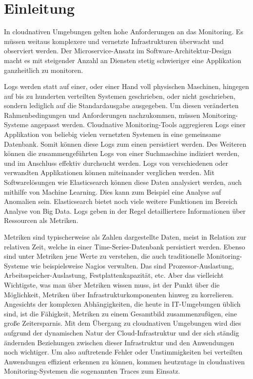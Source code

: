 \section{Einleitung}
\noindent
In cloudnativen Umgebungen gelten hohe Anforderungen an das Monitoring.
Es müssen weitaus komplexere und vernetzte Infrastrukturen überwacht und observiert werden.
Der Microservice-Ansatz im Software-Architektur-Design macht es mit
steigender Anzahl an Diensten stetig schwieriger eine Applikation 
ganzheitlich zu monitoren. 

Logs werden statt auf einer, oder 
einer Hand voll physischen Maschinen, hingegen auf bis zu hunderten
verteilten Systemen geschrieben, oder nicht geschrieben, sondern lediglich auf 
die Standardausgabe ausgegeben. Um diesen veränderten Rahmenbedingungen 
und Anforderungen nachzukommen, müssen Monitoring-Systeme angepasst werden.
Cloudnative Monitoring-Tools aggregieren Logs einer Applikation
von beliebig vielen vernetzten Systemen in eine gemeinsame Datenbank.
Somit können diese Logs zum einen persistiert werden. Des Weiteren können die 
zusammengeführten Logs von einer Suchmaschine indiziert werden, und
im Anschluss effektiv durchsucht werden. Logs von verschiedenen oder 
verwandten Applikationen können miteinander verglichen werden.
Mit Softwarelösungen wie Elasticsearch \cite{elasticsearchWebsite}
können diese Daten analysiert werden, auch mithilfe von Machine Learning.
Dies kann zum Beispiel eine Analyse auf Anomalien sein.
Elasticsearch bietet noch viele weitere Funktionen im Bereich
Analyse von Big Data.
Logs geben in der Regel detailliertere Informationen über Ressourcen als Metriken.

Metriken sind typischerweise als Zahlen dargestellte Daten, meist in Relation
zur relativen Zeit, welche in einer Time-Series-Datenbank persistiert werden.
Ebenso sind unter Metriken jene Werte zu verstehen, 
die auch traditionelle Monitoring-Systeme wie beispielsweise
Nagios \cite{nagiosOrgWebsite}
verwalten. Das sind Prozessor-Auslastung, Arbeitsspeicher-Auslastung,
Festplattenkapazität, etc.
Aber das vielleicht Wichtigste, was man über Metriken wissen muss, ist der Punkt 
über die Möglichkeit, Metriken über Infrastrukturkomponenten hinweg zu korrelieren. 
Angesichts der komplexen Abhängigkeiten, die heute in IT-Umgebungen üblich sind, 
ist die Fähigkeit, Metriken zu einem Gesamtbild zusammenzufügen, eine große Zeitersparnis.
Mit dem Übergang zu cloudnativen Umgebungen wird dies aufgrund der dynamischen Natur der
Cloud-Infrastruktur und der sich ständig ändernden Beziehungen zwischen dieser
Infrastruktur und den Anwendungen noch wichtiger.
Um also auftretende Fehler oder Unstimmigkeiten bei verteilten Anwendungen
effizient erkennen zu können, kommen heutzutage in cloudnativen Monitoring-Systemen
die sogenannten Traces zum Einsatz.

